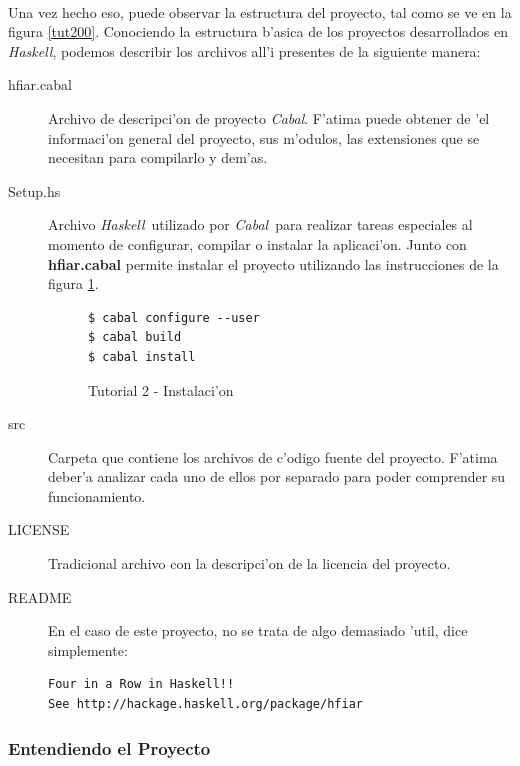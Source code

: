 \documentclass[a4paper]{article}
\newcommand{\haskell}{\textsl{Haskell}}
\newcommand{\cabal}{\textsl{Cabal}}
\begin{document}
\paragraph{}Una vez hecho eso, puede observar la estructura del proyecto, tal como se ve en la figura \ref{tut200}.  Conociendo la estructura b'asica de los proyectos desarrollados en \haskell, podemos describir los archivos all'i presentes de la siguiente manera:
\begin{description}
\item[hfiar.cabal] Archivo de descripci'on de proyecto \cabal.  F'atima puede obtener de 'el informaci'on general del proyecto, sus m'odulos, las extensiones que se necesitan para compilarlo y dem'as.  
\item[Setup.hs] Archivo \haskell\ utilizado por \cabal\ para realizar tareas especiales al momento de configurar, compilar o instalar la aplicaci'on.  Junto con \textbf{hfiar.cabal} permite instalar el proyecto utilizando las instrucciones de la figura \ref{tut201}.
\begin{figure}[hp]
	\begin{center}
		\begin{center}\begin{lstlisting}
$ cabal configure --user
$ cabal build
$ cabal install
		\end{lstlisting}\end{center}
		\caption{Tutorial 2 - Instalaci'on}
		\label{tut201}
	\end{center}
\end{figure}
\item[src] Carpeta que contiene los archivos de c'odigo fuente del proyecto.  F'atima deber'a analizar cada uno de ellos por separado para poder comprender su funcionamiento.
\item[LICENSE] Tradicional archivo con la descripci'on de la licencia del proyecto.
\item[README] En el caso de este proyecto, no se trata de algo demasiado 'util, dice simplemente:
\begin{verbatim}
Four in a Row in Haskell!!
See http://hackage.haskell.org/package/hfiar
\end{verbatim}
\end{description}

\newpage
\subsubsection{Entendiendo el Proyecto}
\end{document}
